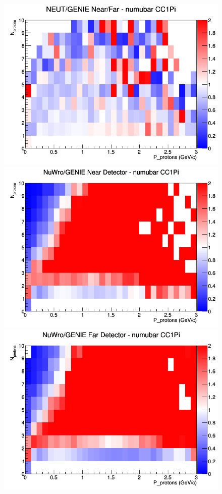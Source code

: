 \documentclass[12pt]{article}
\begin{document}
\begin{figure}[h]
\endminipage
{}
\includegraphics[width=\linewidth]{N_P/nominal/protons/ratios/CC1Pi_NEUT_GENIE_numubar_NF_N_P.png}
\endminipage
\newline
{}
\includegraphics[width=\linewidth]{N_P/nominal/protons/ratios/CC1Pi_NuWro_GENIE_numubar_near_N_P.png}
\endminipage
{}
\includegraphics[width=\linewidth]{N_P/nominal/protons/ratios/CC1Pi_NuWro_GENIE_numubar_far_N_P.png}

\end{figure}
\end{document}
